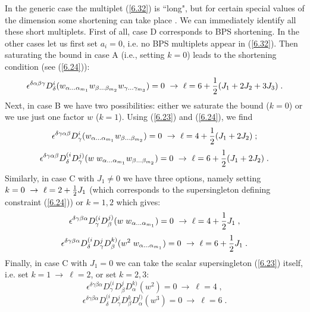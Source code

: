 \documentclass[a4paper,12pt]{article}
\begin{document}
In the generic case the multiplet (\ref{6.32}) is ``long", but for 
certain special values of the dimension some shortening can take 
place \cite{Minw2}. We can immediately identify all these short 
multiplets. First of all, case D corresponds to BPS shortening. 
In the other cases let us first set $a_i=0$, i.e. no BPS 
multiplets appear in (\ref{6.32}). Then saturating the bound in 
case A (i.e., setting $k=0$) leads to the shortening condition 
(see (\ref{6.24})):
\begin{equation}\label{6.3311}
  \epsilon^{\delta\alpha\beta\gamma}
D^i_\delta(w_{\alpha\ldots\alpha_{m_1}}w_{\beta\ldots\beta_{m_2}} 
w_{\gamma\ldots\gamma_{m_3}}) = 0\ \rightarrow \ \ell = 6 
+{1\over 2}(J_1+2J_2+3J_3)\;.
\end{equation}
Next, in case B we have two possibilities: either we saturate the 
bound ($k=0$) or we use just one factor $w$ ($k=1$). Using 
(\ref{6.23}) and (\ref{6.24}), we find
\begin{equation}\label{6.3312}
  \epsilon^{\delta\gamma\alpha\beta} D^i_\gamma(w_{\alpha\ldots\alpha_{m_1}}
w_{\beta\ldots\beta_{m_2}}) = 0\ \rightarrow \ \ell = 4 +{1\over 
2}(J_1+2J_2)\;;
\end{equation}
\begin{equation}\label{6.3313}
 \epsilon^{\delta\gamma\alpha\beta}D^{(i}_\delta
D^{j)}_\gamma(w\;w_{\alpha\ldots\alpha_{m_1}} 
w_{\beta\ldots\beta_{m_2}}) = 0\ \rightarrow \ \ell = 6 +{1\over 
2}(J_1+2J_2)\;.
\end{equation}
Similarly, in case C with $J_1\neq0$ we have three options, namely 
setting $k=0\ \rightarrow \ \ell = 2+{1\over 2}J_1$ (which 
corresponds to the supersingleton defining constraint 
(\ref{6.24})) or $k=1,2$ which gives:
\begin{equation}\label{6.3314}
 \epsilon^{\delta\gamma\beta\alpha}D^{(i}_\gamma
D^{j)}_\beta(w\;w_{\alpha\ldots\alpha_{m_1}}) = 0\ \rightarrow \ 
\ell = 4 +{1\over 2}J_1\;,
\end{equation}
\begin{equation}\label{6.3315}
 \epsilon^{\delta\gamma\beta\alpha}D^{(i}_\delta D^j_\gamma
D^{k)}_\beta(w^2\;w_{\alpha\ldots\alpha_{m_1}}) = 0\ \rightarrow 
\ \ell = 6 +{1\over 2}J_1\;.
\end{equation}
Finally, in case C with $J_1=0$ we can take the scalar 
supersingleton (\ref{6.23}) itself, i.e. set $k=1\ \rightarrow \ 
\ell = 2$, or set $k=2,3$:
\begin{equation}\label{6.3316}
  \epsilon^{\delta\gamma\beta\alpha}D^{(i}_\gamma D^j_\beta
D^{k)}_\alpha(w^2) = 0\ \rightarrow \ \ell = 4\;,
\end{equation}
\begin{equation}\label{6.3317}
  \epsilon^{\delta\gamma\beta\alpha}D^{(i}_\delta D^j_\gamma
D^k_\beta D^{l)}_\alpha(w^3) = 0\ \rightarrow \ \ell = 6\;.
\end{equation}
\end{document}
